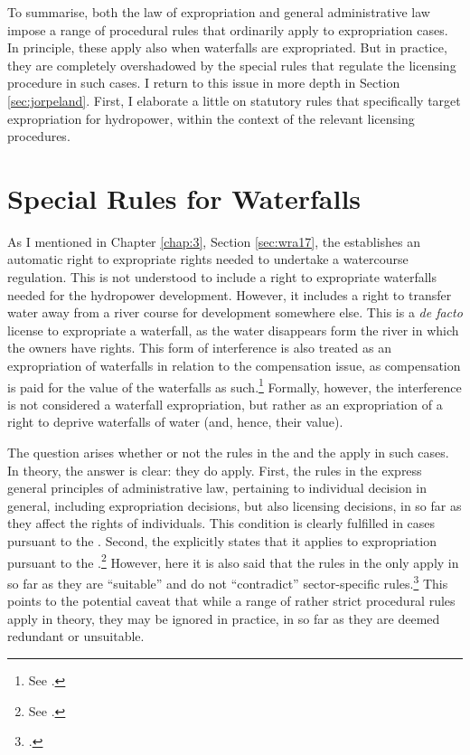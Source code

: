 To summarise, both the law of expropriation and general administrative law impose a range of procedural rules that ordinarily apply to expropriation cases. In principle, these apply also when waterfalls are expropriated. But in practice, they are completely overshadowed by the special rules that regulate the licensing procedure in such cases. I return to this issue in more depth in Section \ref{sec:jorpeland}. First, I elaborate a little on statutory rules that specifically target expropriation for hydropower, within the context of the relevant licensing procedures.

\section{Special Rules for Waterfalls}\label{sec:special}

As I mentioned in Chapter \ref{chap:3}, Section \ref{sec:wra17}, the \cite{wra17} establishes an automatic right to expropriate rights needed to undertake a watercourse regulation. This is not understood to include a right to expropriate waterfalls needed for the hydropower development. However, it includes a right to transfer water away from a river course for development somewhere else. This is a {\it de facto} license to expropriate a waterfall, as the water disappears form the river in which the owners have rights. This form of interference is also treated as an expropriation of waterfalls in relation to the compensation issue, as compensation is paid for the value of the waterfalls as such.\footnote{See \cite{jorpeland11}.} Formally, however, the interference is not considered a waterfall expropriation, but rather as an expropriation of a right to deprive waterfalls of water (and, hence, their value).

The question arises whether or not the rules in the \cite{ea59} and the \cite{paa67} apply in such cases. In theory, the answer is clear: they do apply. First, the rules in the \cite{paa67} express general principles of administrative law, pertaining to individual decision in general, including expropriation decisions, but also licensing decisions, in so far as they affect the rights of individuals. This condition is clearly fulfilled in cases pursuant to the \cite{wra17}. Second, the \cite{ea59} explicitly states that it applies to expropriation pursuant to the \cite{wra17}.\footnote{See \cite[30]{ea59}.} However, here it is also said that the rules in the \cite{ea59} only apply in so far as they are ``suitable'' and do not ``contradict'' sector-specific rules.\footcite[30]{ea59} This points to the potential caveat that while a range of rather strict procedural rules apply in theory, they may be ignored in practice, in so far as they are deemed redundant or unsuitable.

